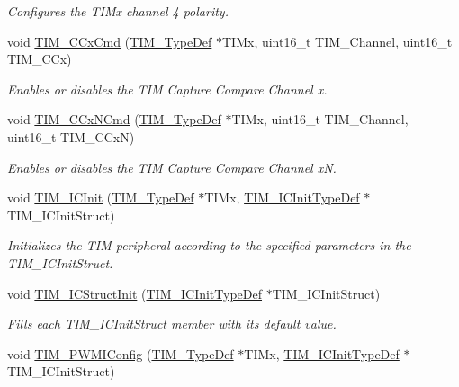 \begin{DoxyCompactItemize}
\begin{DoxyCompactList}\small\item\em Configures the T\+I\+Mx channel 4 polarity. \end{DoxyCompactList}\item 
void \hyperlink{group___t_i_m_ga3ecc4647d9ede261beb5e0535cf29ebb}{T\+I\+M\+\_\+\+C\+Cx\+Cmd} (\hyperlink{struct_t_i_m___type_def}{T\+I\+M\+\_\+\+Type\+Def} $\ast$T\+I\+Mx, uint16\+\_\+t T\+I\+M\+\_\+\+Channel, uint16\+\_\+t T\+I\+M\+\_\+\+C\+Cx)
\begin{DoxyCompactList}\small\item\em Enables or disables the T\+IM Capture Compare Channel x. \end{DoxyCompactList}\item 
void \hyperlink{group___t_i_m_ga304ff7c8a1615498da749bf2507e9f2b}{T\+I\+M\+\_\+\+C\+Cx\+N\+Cmd} (\hyperlink{struct_t_i_m___type_def}{T\+I\+M\+\_\+\+Type\+Def} $\ast$T\+I\+Mx, uint16\+\_\+t T\+I\+M\+\_\+\+Channel, uint16\+\_\+t T\+I\+M\+\_\+\+C\+CxN)
\begin{DoxyCompactList}\small\item\em Enables or disables the T\+IM Capture Compare Channel xN. \end{DoxyCompactList}\item 
void \hyperlink{group___t_i_m_ga9e6a153dd6552e4e1188eba227316f7f}{T\+I\+M\+\_\+\+I\+C\+Init} (\hyperlink{struct_t_i_m___type_def}{T\+I\+M\+\_\+\+Type\+Def} $\ast$T\+I\+Mx, \hyperlink{struct_t_i_m___i_c_init_type_def}{T\+I\+M\+\_\+\+I\+C\+Init\+Type\+Def} $\ast$T\+I\+M\+\_\+\+I\+C\+Init\+Struct)
\begin{DoxyCompactList}\small\item\em Initializes the T\+IM peripheral according to the specified parameters in the T\+I\+M\+\_\+\+I\+C\+Init\+Struct. \end{DoxyCompactList}\item 
void \hyperlink{group___t_i_m_ga5005dac8e4e8a4c7fc2a0ef05b77cc50}{T\+I\+M\+\_\+\+I\+C\+Struct\+Init} (\hyperlink{struct_t_i_m___i_c_init_type_def}{T\+I\+M\+\_\+\+I\+C\+Init\+Type\+Def} $\ast$T\+I\+M\+\_\+\+I\+C\+Init\+Struct)
\begin{DoxyCompactList}\small\item\em Fills each T\+I\+M\+\_\+\+I\+C\+Init\+Struct member with its default value. \end{DoxyCompactList}\item 
void \hyperlink{group___t_i_m_gaa71f9296556310f85628d6c748a06475}{T\+I\+M\+\_\+\+P\+W\+M\+I\+Config} (\hyperlink{struct_t_i_m___type_def}{T\+I\+M\+\_\+\+Type\+Def} $\ast$T\+I\+Mx, \hyperlink{struct_t_i_m___i_c_init_type_def}{T\+I\+M\+\_\+\+I\+C\+Init\+Type\+Def} $\ast$T\+I\+M\+\_\+\+I\+C\+Init\+Struct)

\end{DoxyCompactItemize}
